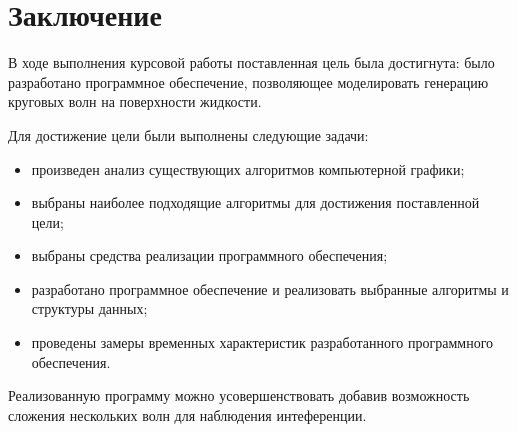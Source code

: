 \chapter*{Заключение}

В ходе выполнения курсовой работы поставленная цель была достигнута: 
было разработано программное обеспечение, позволяющее моделировать 
генерацию круговых волн на поверхности жидкости.

Для достижение цели были выполнены следующие задачи:
\begin{itemize}
    \item произведен анализ существующих алгоритмов компьютерной графики;
    \item выбраны наиболее подходящие алгоритмы для достижения поставленной цели;
    \item выбраны средства реализации программного обеспечения;
    \item разработано программное обеспечение и реализовать выбранные алгоритмы и структуры данных;
    \item проведены замеры временных характеристик разработанного программного обеспечения.
\end{itemize}

Реализованную программу можно усовершенствовать добавив возможность сложения нескольких волн для наблюдения интеференции.
